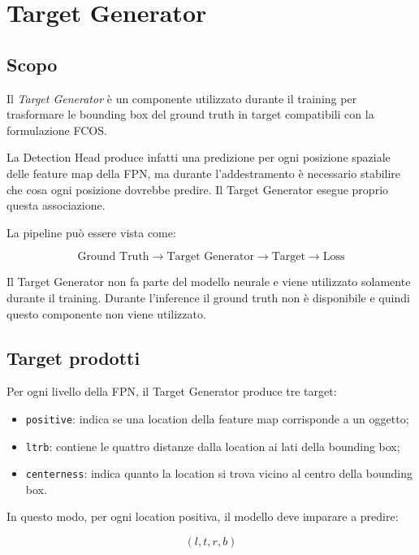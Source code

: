 \section{Target Generator}

\subsection{Scopo}

Il \textit{Target Generator} è un componente utilizzato durante il training per
trasformare le bounding box del ground truth in target compatibili con la
formulazione FCOS.

La Detection Head produce infatti una predizione per ogni posizione spaziale
delle feature map della FPN, ma durante l'addestramento è necessario stabilire
che cosa ogni posizione dovrebbe predire. Il Target Generator esegue proprio
questa associazione.

La pipeline può essere vista come:

\[
\text{Ground Truth}
\rightarrow
\text{Target Generator}
\rightarrow
\text{Target}
\rightarrow
\text{Loss}
\]

Il Target Generator non fa parte del modello neurale e viene utilizzato
solamente durante il training. Durante l'inference il ground truth non è
disponibile e quindi questo componente non viene utilizzato.

\subsection{Target prodotti}

Per ogni livello della FPN, il Target Generator produce tre target:

\begin{itemize}
    \item \texttt{positive}: indica se una location della feature map
    corrisponde a un oggetto;
    
    \item \texttt{ltrb}: contiene le quattro distanze dalla location ai lati
    della bounding box;
    
    \item \texttt{centerness}: indica quanto la location si trova vicino al
    centro della bounding box.
\end{itemize}

In questo modo, per ogni location positiva, il modello deve imparare a
predire:

\[
(l,t,r,b)
\]

